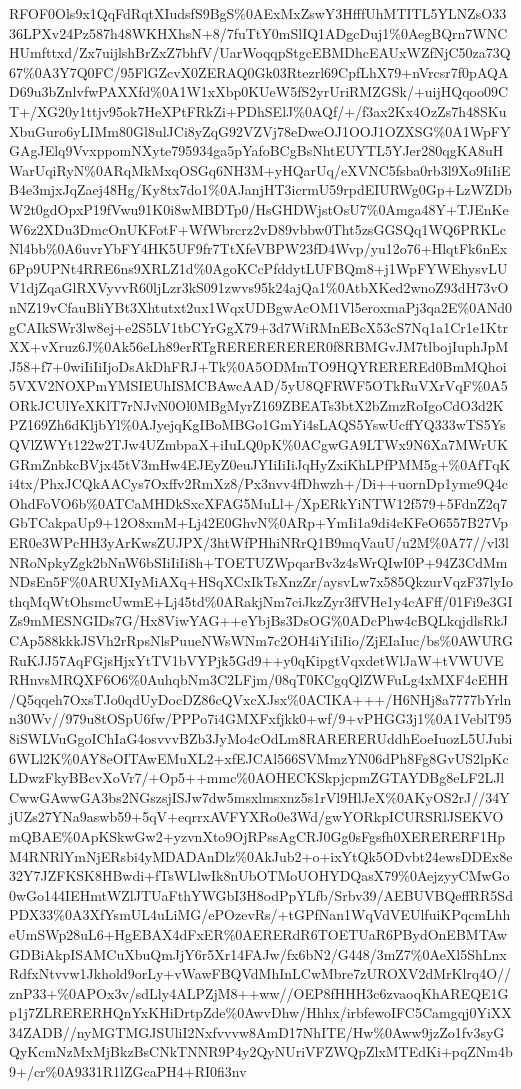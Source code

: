 \documentclass[]{article}
\begin{document}
RFOF0Ols9x1QqFdRqtXIudsfS9BgS\%0AExMxZswY3HfffUhMTITL5YLNZsO3336LPXv24Pz587h48WKHXhsN+8/7fuTtY0mSlIQ1ADgcDuj1\%0AegBQrn7WNCHUmfttxd/Zx7uijlshBrZxZ7bhfV/UarWoqqpStgcEBMDhcEAUxWZfNjC50za73Q67\%0A3Y7Q0FC/95FlGZcvX0ZERAQ0Gk03Rtezrl69CpfLhX79+nVrcsr7f0pAQAD69u3bZnlvfwPAXXfd\%0A1W1xXbp0KUeW5fS2yrUriRMZGSk/+uijHQqoo09CT+/XG20y1ttjv95ok7HeXPtFRkZi+PDhSElJ\%0AQf/+/f3ax2Kx4OzZs7h48SKuXbuGuro6yLIMm80Gl8ulJCi8yZqG92VZVj78eDweOJ1OOJ1OZXSG\%0A1WpFYGAgJElq9VvxppomNXyte795934ga5pYafoBCgBsNhtEUYTL5YJer280qgKA8uHWarUqiRyN\%0ARqMkMxqOSGq6NH3M+yHQarUq/eXVNC5fsba0rb3l9Xo9IiIiEB4e3mjxJqZaej48Hg/Ky8tx7do1\%0AJanjHT3icrmU59rpdEIURWg0Gp+LzWZDbW2t0gdOpxP19fVwu91K0i8wMBDTp0/HsGHDWjstOsU7\%0Amga48Y+TJEnKeW6z2XDu3DmcOnUKFotF+WfWbrcrz2vD89vbbw0Tht5zsGGSQq1WQ6PRKLcNl4bb\%0A6uvrYbFY4HK5UF9fr7TtXfeVBPW23fD4Wvp/yu12o76+HlqtFk6nEx6Pp9UPNt4RRE6ns9XRLZ1d\%0AgoKCcPfddytLUFBQm8+j1WpFYWEhysvLUV1djZqaGlRXVyvvR60ljLzr3kS091zwvs95k24ajQa1\%0AtbXKed2wnoZ93dH73vOnNZ19vCfauBliYBt3Xhtutxt2ux1WqxUDBgwAcOM1Vl5eroxmaPj3qa2E\%0ANd0gCAIkSWr3lw8ej+e2S5LV1tbCYrGgX79+3d7WiRMnEBcX53cS7Nq1a1Cr1e1KtrXX+vXruz6J\%0Ak56eLh89erRTgRERERERERER0f8RBMGvJM7tlbojIuphJpMJ58+f7+0wiIiIiIjoDsAkDhFRJ+Tk\%0A5ODMmTO9HQYREREREd0BmMQhoi5VXV2NOXPmYMSIEUhISMCBAwcAAD/5yU8QFRWF5OTkRuVXrVqF\%0A5ORkJCUlYeXKlT7rNJvN0Ol0MBgMyrZ169ZBEATs3btX2bZmzRoIgoCdO3d2KPZ169Zh6dKljbYl\%0AJyejqKgIBoMBGo1GmYi4sLAQS5YswUcffYQ333wTS5YsQVlZWYt122w2TJw4UZmbpaX+iIuLQ0pK\%0ACgwGA9LTWx9N6Xa7MWrUKGRmZnbkcBVjx45tV3mHw4EJEyZ0euJYIiIiIiJqHyZxiKhLPfPMM5g+\%0AfTqKi4tx/PhxJCQkAACys7Oxffv2RmXz8/Px3nvv4fDhwzh+/Di++uornDp1yme9Q4cOhdFoVO6b\%0ATCaMHDkSxcXFAG5MuLl+/XpERkYiNTW12f579+5FdnZ2q7GbTCakpaUp9+12O8xmM+Lj42E0GhvN\%0ARp+YmIi1a9di4cKFeO6557B27VpER0e3WPcHH3yArKwsZUJPX/3htWfPHhiNRrQ1B9mqVauU/u2M\%0A77//vl3lNRoNpkyZgk2bNnW6bSIiIiIi8h+TOETUZWpqarBv3z4sWrQIwI0P+94Z3CdMmNDsEn5F\%0ARUXIyMiAXq+HSqXCxIkTsXnzZr/aysvLw7x585QkzurVqzF37lyIothqMqWtOhsmcUwmE+Lj45td\%0ARakjNm7ciJkzZyr3ffVHe1y4cAFff/01Fi9e3GIZs9mMESNGIDs7G/Hx8ViwYAG++eYbjBs3DsOG\%0ADcPhw4cBQLkqjdlsRkJCAp588kkkJSVh2rRpsNlsPuueNWsWNm7c2OH4iYiIiIio/ZjEIaIuc/bs\%0AWURGRuKJJ57AqFGjsHjxYtTV1bVYPjk5Gd9++y0qKipgtVqxdetWlJaW+tVWUVERHnvsMRQXF6O6\%0AuhqbNm3C2LFjm/08qT0KCgqQlZWFuLg4xMXF4cEHH/Q5qqeh7OxsTJo0qdUyDocDZ86cQVxcXJsx\%0ACIKA+++/H6NHj8a7777bYrlnn30Wv//979u8tOSpU6fw/PPPo7i4GMXFxfjkk0+wf/9+vPHGG3j1\%0A1VeblT958iSWLVuGgoIChIaG4osvvvBZb3JyMo4cOdLm8RARERERUddhEoeIuozL5UJubi6WLl2K\%0AY8eOITAwEMuXL2+xfEJCAl566SVMmzYN06dPh8Fg8GvUS2lpKcLDwzFkyBBcvXoVr7/+Op5++mmc\%0AOHECKSkpjcpmZGTAYDBg8eLF2LJlCwwGAwwGA3bs2NGszsjISJw7dw5msxlmsxnz5s1rVl9HlJeX\%0AKyOS2rJ//34YjUZs27YNa9aswb59+5qV+eqrrxAVFYXRo0e3Wd/gwYORkpICURSRlJSEKVOmQBAE\%0ApKSkwGw2+yzvnXto9OjRPssAgCRJ0Gg0sFgsfh0XERERERF1HpM4RNRlYmNjERsbi4yMDADAnDlz\%0AkJub2+o+ixYtQk5ODvbt24ewsDDEx8e32Y7JZFKSK8HBwdi+fTsWLlwIk8nUbOTMoUOHYDQasX79\%0AejzyyCMwGo0wGo144IEHmtWZlJTUaFthYWGbI3H8odPpYLfb/Srbv39/AEBUVBQeffRR5SdPDX33\%0A3XfYsmUL4uLiMG/ePOzevRs/+tGPfNan1WqVdVEUlfuiKPqcmLhheUmSWp28uL6+HgEBAX4dFxER\%0AERERdR6TOETUaR6PBydOnEBMTAwGDBiAkpISAMCuXbuQmJjY6r5Xr14FAJw/fx6bN2/G448/3mZ7\%0AeXl5ShLnxRdfxNtvvw1Jkhold9orLy+vWawFBQVdMhInLCwMbre7zUROXV2dMrKlrq4O//znP33+\%0APOx3v/sdLly4ALPZjM8++ww//OEP8fHHH3c6zvaoqKhAREQE1Gp1j7ZLRERERHQnYxKHiDrtpZde\%0AwvDhw/Hhhx/irbfewoIFC5Camgqj0YiXX34ZADB//nyMGTMGJSUliI2Nxfvvvw8AmD17NhITE/Hw\%0Aww9jzZo1fv3syGQyKcmNzMxMjBkzBsCNkTNNR9P4y2QyNUriVFZWQpZlxMTEdKi+pqZNm4b9+/cr\%0A9331R1lZGcaPH4+RI0fi3nv
\end{document}
